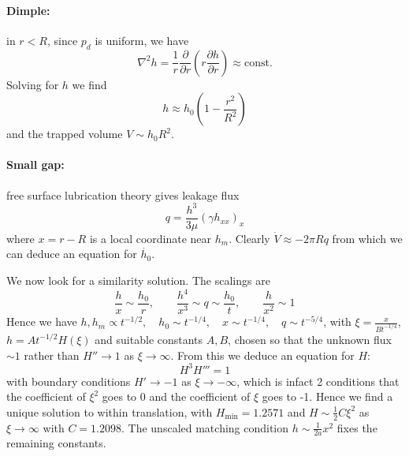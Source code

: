 \documentclass{jknotes}
\begin{document}
\paragraph{Dimple:} in $r < R$, since $p_d$ is uniform, we have
\begin{equation}
	\nabla^2 h = \frac{1}{r} \frac{\partial}{\partial r} \left( r \frac{\partial
	h}{\partial r}\right) \approx \text{const.}
\end{equation}
Solving for $h$ we find
\begin{equation}
	h \approx h_0 \left( 1- \frac{r^2}{R^2}\right)
\end{equation}
and the trapped volume $V \sim h_0 R^2$.

\paragraph{Small gap:} free surface lubrication theory gives leakage flux 
\begin{equation}
	q = \frac{h^3}{3\mu} (\gamma h_{xx})_x
\end{equation}
where $x = r-R$ is a local coordinate near $h_m$. Clearly $\dot{V} \approx
-2\pi R q $ from which we can deduce an equation for $\dot{h_0}$.

\begin{center}
\end{center}

We now look for a similarity solution. The scalings are
\begin{equation}
	\frac{h}{x} \sim \frac{h_0}{r}, \hspace{2em} \frac{h^4}{x^3} \sim q \sim
	\frac{h_0}{t}, \hspace{2em} \frac{h}{x^2} \sim 1
\end{equation}
Hence we have $h, h_m \propto t^{-1/2}, \hspace{1em} h_0 \sim t^{-1/4},
\hspace{1em} x \sim t^{-1/4}, \hspace{1em} q \sim t^{-5/4}$, with $\xi =
\frac{x}{Bt^{-1/4}}$, $h = At^{-1/2}H(\xi)$ and suitable constants $A, B$,
chosen so that the unknown flux $\sim 1$ rather than $H'' \to 1$ as $\xi \to
\infty$. From this we deduce an equation for $H$:
\begin{equation}
	H^3 H''' = 1
\end{equation}
with boundary conditions $H' \to -1$ as $\xi \to -\infty$, which is infact 2
conditions that the coefficient of $\xi^2$ goes to 0 and the coefficient of
$\xi$ goes to -1. Hence we find a unique solution to within translation, with
$H_{\text{min}} = 1.2571$ and $H \sim \frac{1}{2}C \xi^2$ as $\xi \to \infty$
with $C = 1.2098$. The unscaled matching condition $h \sim \frac{1}{2a} x^2$
fixes the remaining constants.
\end{document}
